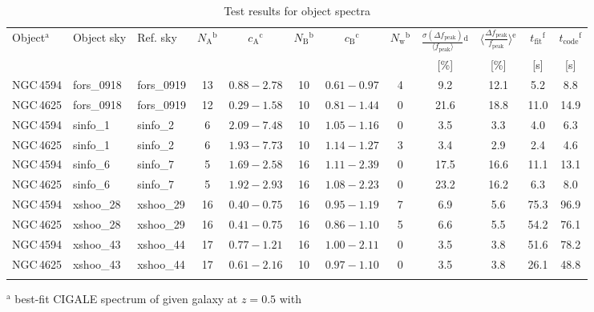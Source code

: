 \begin{table}
\caption[]{Test results for object spectra}
\label{tab:results_obj}
\centering
\vspace{5pt}
\footnotesize
\begin{tabular}{l l l c c c c c c c c c}
\hline\hline
\noalign{\smallskip}
Object$^\mathrm{a}$ & Object sky & Ref. sky & $N_\mathrm{A}$$^\mathrm{b}$ &
$c_\mathrm{A}$$^\mathrm{c}$ & $N_\mathrm{B}$$^\mathrm{b}$ & $c_\mathrm{B}$$^\mathrm{c}$ &
$N_\mathrm{w}$$^\mathrm{b}$ & $\frac{\sigma(\Delta f_\mathrm{peak})}
{\langle f_\mathrm{peak} \rangle}$$^\mathrm{d}$ &
$\langle \frac{\Delta f_\mathrm{peak}}{f_\mathrm{peak}} \rangle$$^\mathrm{e}$ &
$t_\mathrm{fit}$$^\mathrm{f}$ & $t_\mathrm{code}$$^\mathrm{f}$ \\
& & & & & & & & [\%] & [\%] & [s] & [s] \\
\noalign{\smallskip}
\hline
\noalign{\smallskip}
NGC\,4594 & fors\_0918 & fors\_0919 & 13 & $0.88-2.78$ & 10 & $0.61-0.97$ & 4 &
9.2 & 12.1 & 5.2 & 8.8 \\
NGC\,4625 & fors\_0918 & fors\_0919 & 12 & $0.29-1.58$ & 10 & $0.81-1.44$ & 0 &
21.6 & 18.8 & 11.0 & 14.9 \\
NGC\,4594 & sinfo\_1 & sinfo\_2 & 6 & $2.09-7.48$ & 10 & $1.05-1.16$ & 0 &
3.5 & 3.3 & 4.0 & 6.3 \\
NGC\,4625 & sinfo\_1 & sinfo\_2 & 6 & $1.93-7.73$ & 10 & $1.14-1.27$ & 3 &
3.4 & 2.9 & 2.4 & 4.6 \\
NGC\,4594 & sinfo\_6 & sinfo\_7 & 5 & $1.69-2.58$ & 16 & $1.11-2.39$ & 0 &
17.5 & 16.6 & 11.1 & 13.1 \\
NGC\,4625 & sinfo\_6 & sinfo\_7 & 5 & $1.92-2.93$ & 16 & $1.08-2.23$ & 0 &
23.2 & 16.2 & 6.3 & 8.0 \\
NGC\,4594 & xshoo\_28 & xshoo\_29 & 16 & $0.40-0.75$ & 16 & $0.95-1.19$ & 7 &
6.9 & 5.6 & 75.3 & 96.9 \\
NGC\,4625 & xshoo\_28 & xshoo\_29 & 16 & $0.41-0.75$ & 16 & $0.86-1.10$ & 5 &
6.6 & 5.5 & 54.2 & 76.1 \\
NGC\,4594 & xshoo\_43 & xshoo\_44 & 17 & $0.77-1.21$ & 16 & $1.00-2.11$ & 0 &
3.5 & 3.8 & 51.6 & 78.2 \\
NGC\,4625 & xshoo\_43 & xshoo\_44 & 17 & $0.61-2.16$ & 10 & $0.97-1.10$ & 0 &
3.5 & 3.8 & 26.1 & 48.8 \\
\noalign{\smallskip}
\hline
\end{tabular}
\footnotesize
\begin{list}{}{}
\item[$^\mathrm{a}$] best-fit CIGALE spectrum of given galaxy at $z = 0.5$ with

\end{list}
\end{table}
